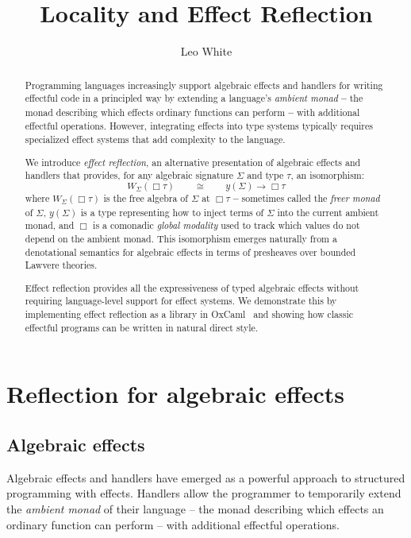 \documentclass[acmsmall, screen, review, anonymous]{acmart}
\title{Locality and Effect Reflection}
\author{Leo White}
\affiliation{\institution{Jane Street}\country{UK}}
\date{}
\theoremstyle{definition}
\newcommand{\glob}{\mathop{\Box}}
\newcommand{\yoneda}[1]{y(#1)}
\newcommand{\ind}[1]{W_{#1}}
\begin{document}
\begin{abstract}
  Programming languages increasingly support algebraic effects and
  handlers for writing effectful code in a principled way by extending a
  language's \emph{ambient monad} \textbf{--} the monad describing which
  effects ordinary functions can perform \textbf{--} with additional
  effectful operations. However, integrating effects into type systems
  typically requires specialized effect systems that add complexity to
  the language.

  We introduce \emph{effect reflection}, an alternative presentation of
  algebraic effects and handlers that provides, for any algebraic
  signature $\Sigma$ and type $\tau$, an isomorphism:
  \begin{equation*}
    \ind{\Sigma}(\glob \tau)
    \qquad \cong \qquad
    \yoneda{\Sigma} \rightarrow \glob \tau
  \end{equation*}
  where $\ind{\Sigma}(\glob \tau)$ is the free algebra of $\Sigma$ at
  $\glob \tau$ \textbf{--} sometimes called the \emph{freer monad} of
  $\Sigma$, $\yoneda{\Sigma}$ is a type representing how to inject terms
  of $\Sigma$ into the current ambient monad, and $\glob$ is a comonadic
  \emph{global modality} used to track which values do not depend on the
  ambient monad. This isomorphism emerges naturally from a denotational
  semantics for algebraic effects in terms of presheaves over bounded
  Lawvere theories.

  Effect reflection provides all the expressiveness of typed algebraic
  effects without requiring language-level support for effect systems. We
  demonstrate this by implementing effect reflection as a library in
  OxCaml~\cite{lorenzen2024oxidizing} and showing how classic effectful
  programs can be written in natural direct style.
\end{abstract}

\maketitle

\section{Reflection for algebraic effects}

\subsection{Algebraic effects}
Algebraic effects and handlers have emerged as a powerful approach to
structured programming with effects. Handlers allow the programmer to
temporarily extend the \emph{ambient monad} of their language -- the
monad describing which effects an ordinary function can perform -- with
additional effectful operations.
\end{document}
